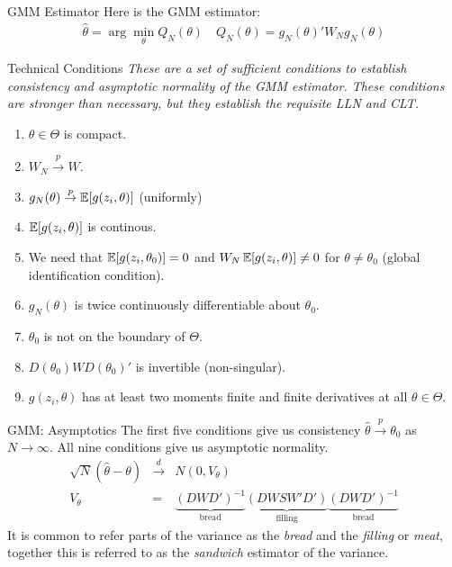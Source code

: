\begin{frame}{GMM Estimator}
Here is the GMM estimator:
\begin{eqnarray*}
\hat{\theta} = \arg \min_{\theta}  Q_N(\theta) \quad Q_N(\theta)=g_N(\theta)' W_N  g_N(\theta)
\end{eqnarray*}

\end{frame}


\begin{frame}{Technical Conditions}
\textit{These are a set of sufficient conditions to establish consistency and asymptotic normality of the GMM estimator. These conditions are stronger than necessary, but they establish the requisite LLN and CLT.}
\begin{enumerate}
\item $\theta \in \Theta$ is compact.
\item $W_N \overset{p}{\to} W$.
\item $g_N(\theta) \overset{p}{\to} \mathbb{E}[g(z_i,\theta)]$ (uniformly)
\item $\mathbb{E}[g(z_i,\theta)]$ is continous.
\item We need that $\mathbb{E}[g(z_i,\theta_0)]=0$ and $W_N\, \mathbb{E}[g(z_i,\theta)] \neq 0$ for $\theta \neq \theta_0$ (global identification condition).
\item $g_N(\theta)$ is twice continuously differentiable about $\theta_0$.
\item $\theta_0$ is not on the boundary of $\Theta$.
\item $D(\theta_0) W D(\theta_0)'$ is invertible (non-singular).
\item $g(z_i,\theta)$ has at least two moments finite and finite derivatives at all $\theta \in \Theta$.
\end{enumerate}
\end{frame}


\begin{frame}{GMM: Asymptotics}
The first five conditions give us consistency $\hat{\theta} \overset{p}{\to} \theta_0$ as $N \rightarrow \infty$. All nine conditions give us asymptotic normality.
\begin{eqnarray*}
\sqrt{N}(\hat{\theta}-\theta)  &\overset{d}{\to}& N(0,V_{\theta})\\
V_{\theta} &=& \underbrace{(D W D')^{-1}}_{\mbox{bread}} \underbrace{(D W S W' D')}_{\mbox{filling}}\underbrace{(D W D')^{-1}}_{\mbox{bread}} 
\end{eqnarray*}
It is common to refer parts of the variance as the \textit{bread} and the \textit{filling} or \textit{meat}, together this is referred to as the \textit{sandwich} estimator of the variance.
\end{frame}

